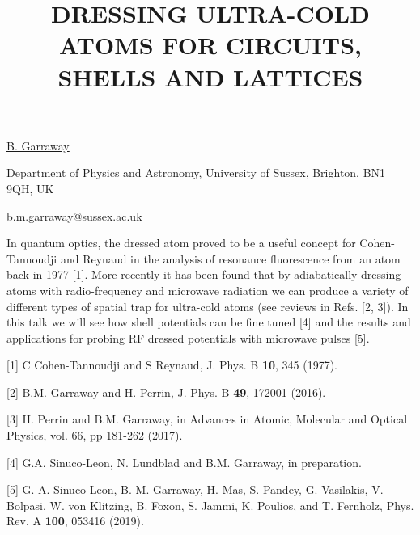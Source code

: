 \title{DRESSING ULTRA-COLD ATOMS FOR CIRCUITS, SHELLS AND LATTICES}

\underline{B. Garraway} 

{\normalsize{\vspace{-4mm}
Department of Physics and Astronomy,
University of Sussex,
Brighton, BN1 9QH, UK



\email b.m.garraway@sussex.ac.uk}}

In quantum optics, the dressed atom proved to be a useful concept for Cohen-Tannoudji and Reynaud in the analysis of resonance fluorescence from an atom back in 1977 [1]. More recently it has been found that by adiabatically dressing atoms with radio-frequency and microwave radiation we can produce a variety of different types of spatial trap for ultra-cold atoms (see reviews in Refs. [2, 3]). In this talk we will see how shell potentials can be fine tuned [4] and the results and applications for probing RF dressed potentials with microwave pulses [5].

{\normalsize
[1] C Cohen-Tannoudji and S Reynaud, J. Phys. B \textbf{10}, 345 (1977).
\vsp

[2] B.M. Garraway and H. Perrin, J. Phys. B \textbf{49}, 172001 (2016).
\vsp

[3] H. Perrin and B.M. Garraway, in Advances in Atomic, Molecular and Optical Physics, vol. 66, pp 181-262 (2017).
\vsp

[4] G.A. Sinuco-Leon, N. Lundblad and B.M. Garraway, in preparation.
\vsp

[5] G. A. Sinuco-Leon, B. M. Garraway, H. Mas, S. Pandey, G. Vasilakis, V. Bolpasi, W. von Klitzing, B. Foxon, S. Jammi, K. Poulios, and T. Fernholz, Phys. Rev. A \textbf{100}, 053416 (2019).
}

\vspace{\baselineskip}